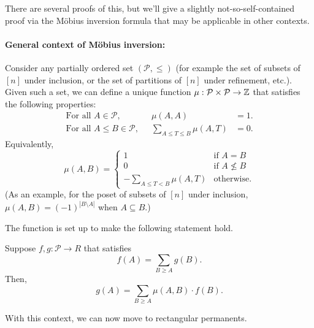 There are several proofs of this, but we'll give a slightly not-so-self-contained proof via the M\"obius inversion formula that may be applicable in other contexts. 

\paragraph{General context of M\"obius inversion:} Consider any partially ordered set $(\mathcal{P}, \leq)$ (for example the set of subsets of $[n]$ under inclusion, or the set of partitions of $[n]$ under refinement, etc.). Given such a set, we can define a unique \Mobius{} function $\mu: \mathcal{P}\times \mathcal{P} \rightarrow \mathbb{Z}$ that satisfies the following properties:
\begin{align*}
\text{For all $A \in \mathcal{P}$,}& &\mu(A, A)  &= 1.\\
\text{For all $A\leq B \in \mathcal{P}$,}& &\sum_{A \leq T \leq B} \mu(A, T) &= 0.
\end{align*}
\noindent
Equivalently, 
\[
\mu(A,B) = \begin{cases}
  1 & \text{if $A = B$}\\
  0 & \text{if $A \nleq B$}\\
  -\sum_{A \leq T < B} \mu(A, T) & \text{otherwise}.
  \end{cases}
\]
(As an example, for the poset of subsets of $[n]$ under inclusion, $\mu(A,B) = (-1)^{|B \setminus A|}$ when $A \subseteq B$.)

The \Mobius{} function is set up to make the following statement hold. 

\begin{lemma}
  Suppose $f,g: \mathcal{P} \rightarrow R$ that satisfies
  \[
  f(A) = \sum_{B \geq A} g(B).
  \]
  Then, 
  \[
  g(A) = \sum_{B \geq A} \mu(A,B) \cdot f(B).
  \]
\end{lemma}

With this context, we can now move to rectangular permanents. 

